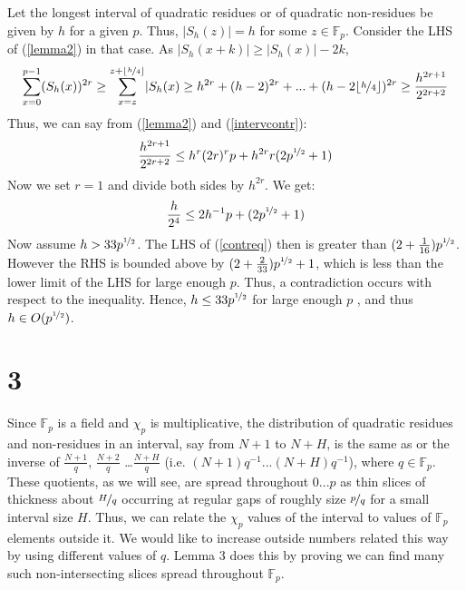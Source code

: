 \documentclass{article}
\begin{document}
Let the longest interval of quadratic residues or of quadratic non-residues be given by $h$ for a given $p$. Thus, $\lvert S_h(z)\rvert=h$ for some $z\in \mathbb{F}_p$. Consider the LHS of (\ref{lemma2}) in that case. As $\lvert S_h(x+k)\rvert \geq \lvert S_h(x)\rvert-2k$,
\begin{equation} \label{intervcontr}
\sum\limits_{x=0}^{p-1}(S_h(x))^{2r}\geq\sum\limits_{x=z}^{z+\lfloor\nicefrac{h}{4}\rfloor}\lvert S_h(x)\geq h^{2r}+(h-2)^{2r}+...+(h-2\lfloor\nicefrac{h}{4}\rfloor)^{2r} \geq \frac{h^{2r+1}}{2^{2r+2}}
\end{equation}
Thus, we can say from (\ref{lemma2}) and (\ref{intervcontr}):
$$ \frac{h^{2r+1}}{2^{2r+2}} \leq h^{r}(2r)^{r}p+h^{2r}r(2p^{\nicefrac{1}{2}}+1)$$
Now we set $r=1$ and divide both sides by $h^{2r}$. We get:
\begin{equation} \label{contreq}
\frac{h}{2^{4}} \leq 2h^{-1}p+(2p^{\nicefrac{1}{2}}+1)
\end{equation}
Now assume $h>33p^{\nicefrac{1}{2}}$. The LHS of (\ref{contreq}) then is greater than $(2+\frac{1}{16})p^{\nicefrac{1}{2}}$. However the RHS is bounded above by $(2+\frac{2}{33})p^{\nicefrac{1}{2}}+1$, which is less than the lower limit of the LHS for large enough $p$. Thus, a contradiction occurs with respect to the inequality. Hence, $h\leq 33p^{\nicefrac{1}{2}}$ for large enough $p$ , and thus $h\in O(p^{\nicefrac{1}{2}})$.
%
\section{ 3}
%
Since $\mathbb{F}_p$ is a field and $\chi_p$ is multiplicative, the distribution of quadratic residues and non-residues in an interval, say from $N+1$ to $N+H$, is the same as or the inverse of $\frac{N+1}{q}$, $\frac{N+2}{q}$ \ldots $\frac{N+H}{q}$ (i.e. $(N+1)q^{-1}...(N+H)q^{-1}$), where $q\in\mathbb{F}_p$. These quotients, as we will see, are spread throughout $0...p$ as thin slices of thickness about $\nicefrac{H}{q}$ occurring at regular gaps of roughly size $\nicefrac{p}{q}$ for a small interval size $H$. Thus, we can relate the $\chi_p$ values of the interval to values of $\mathbb{F}_p$ elements outside it. We would like to increase outside numbers related this way by using different values of $q$. Lemma 3 does this by proving we can find many such non-intersecting slices spread throughout $\mathbb{F}_p$.
\end{document}
